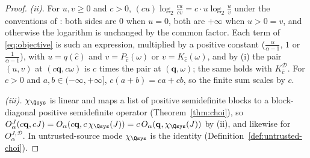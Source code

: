 \begin{proof}
\emph{(ii).} For $u,v\ge0$ and $c>0$,
$(cu)\log_2\frac{cu}{cv}=c\cdot u\log_2\frac uv$ under the conventions of
: both sides are $0$ when $u=0$, both are $+\infty$
when $u>0=v$, and otherwise the logarithm is unchanged by the common factor.
Each term of \eqref{eq:objective} is such an expression, multiplied by a
positive constant ($\frac{\alpha}{\alpha-1}$, $1$ or $\frac1{\alpha-1}$),
with $u=q(\hat c)$ and $v=P_{\hat c}(\omega)$ or $v=K_{\hat c}(\omega)$, and
by (i) the pair $(u,v)$ at $(c\mathbf q,c\omega)$ is $c$ times the pair at
$(\mathbf q,\omega)$; the same holds with $K^{\mathcal{D}}_{\hat c}$. For
$c>0$ and $a,b\in(-\infty,+\infty]$, $c(a+b)=ca+cb$, so the finite sum scales
by $c$.

\emph{(iii).} $\chi_{\Qsys}$ is linear and maps a list of positive
semidefinite blocks to a block-diagonal positive semidefinite operator
(Theorem~\ref{thm:choi}), so
$O^{J}_{\alpha}(c\mathbf q,cJ)=O_{\alpha}(c\mathbf q,c\,\chi_{\Qsys}(J))
=c\,O_{\alpha}(\mathbf q,\chi_{\Qsys}(J))$ by (ii), and likewise for
$O^{J,\mathcal{D}}_{\alpha}$. In untrusted-source mode
$\chi_{\Qsys}$ is the identity (Definition~\ref{def:untrusted-choi}).
\end{proof}

